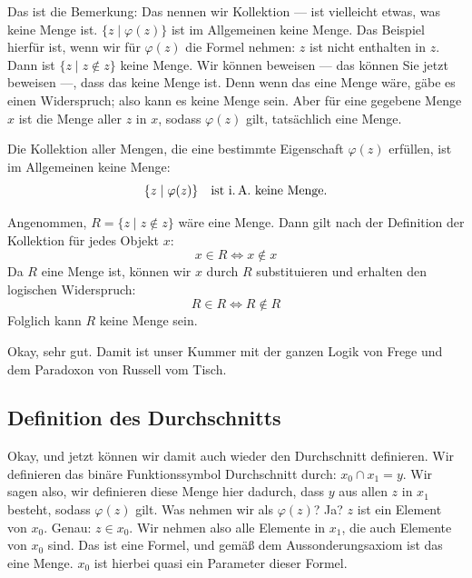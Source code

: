 \begin{spoken-clean}[00:30:51 - 00:32:45]
Das ist die Bemerkung: Das nennen wir Kollektion ---  ist vielleicht etwas, was keine Menge ist. $\{ z \mid \varphi(z) \}$ ist im Allgemeinen keine Menge. Das Beispiel hierfür ist, wenn wir für $\varphi(z)$ die Formel nehmen: $z$ ist nicht enthalten in $z$. Dann ist $\{ z \mid z \notin z \}$ keine Menge. Wir können beweisen --- das können Sie jetzt beweisen ---, dass das keine Menge ist. Denn wenn das eine Menge wäre, gäbe es einen Widerspruch; also kann es keine Menge sein. Aber für eine gegebene Menge $x$ ist die Menge aller $z$ in $x$, sodass $\varphi(z)$ gilt, tatsächlich eine Menge.
\end{spoken-clean}

\begin{math-stroke}
\begin{remark}
Die Kollektion aller Mengen, die eine bestimmte Eigenschaft $\varphi(z)$ erfüllen, ist im Allgemeinen keine Menge:
\[
\{ z \mid \varphi(z) \} \quad \text{ist i.\,A.\ keine Menge.}
\]
\end{remark}


\begin{short-proof}
Angenommen, $R = \{ z \mid z \notin z \}$ wäre eine Menge. Dann gilt nach der Definition der Kollektion für jedes Objekt $x$:
\[
x \in R \iff x \notin x
\]
Da $R$ eine Menge ist, können wir $x$ durch $R$ substituieren und erhalten den logischen Widerspruch:
\[
R \in R \iff R \notin R
\]
Folglich kann $R$ keine Menge sein.
\end{short-proof}
\end{math-stroke}

\begin{spoken-clean}[00:32:45 - 00:33:09]
Okay, sehr gut. Damit ist unser Kummer mit der ganzen Logik von Frege und dem Paradoxon von Russell vom Tisch.
\end{spoken-clean}

\subsection{Definition des Durchschnitts}
\begin{spoken-clean}[00:33:09 - 00:35:00]
Okay, und jetzt können wir damit auch wieder den Durchschnitt definieren. Wir definieren das binäre Funktionssymbol Durchschnitt durch: $x_0 \cap x_1 = y$. Wir sagen also, wir definieren diese Menge hier dadurch, dass $y$ aus allen $z$ in $x_1$ besteht, sodass $\varphi(z)$ gilt. Was nehmen wir als $\varphi(z)$? Ja? $z$ ist ein Element von $x_0$. Genau: $z \in x_0$. Wir nehmen also alle Elemente in $x_1$, die auch Elemente von $x_0$ sind. Das ist eine Formel, und gemäß dem Aussonderungsaxiom ist das eine Menge. $x_0$ ist hierbei quasi ein Parameter dieser Formel.
\end{spoken-clean}

